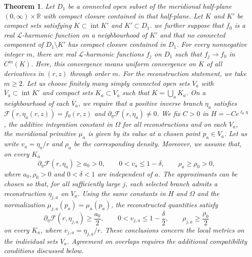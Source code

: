 \documentclass[amsmath,amsfonts,amssymb,aps,pra,superscriptaddress,10pt]{revtex4-2}
\numberwithin{equation}{section}
\theoremstyle{plain}
\newtheorem{theorem}{Theorem}
\theoremstyle{definition}
\theoremstyle{remark}
\theoremstyle{definition}
\newcommand{\ellzero}{\ell_0}
\begin{document}
\begin{theorem}
Let $D_1$ be a connected open subset of the meridional half-plane $(0,\infty)\times\mathbb{R}$ with compact closure contained in that half-plane. Let $K$ and $K'$ be compact sets satisfying $K\subset\operatorname{int}K'$ and $K'\subset D_1$. we further suppose that $f_0$ is a real $\mathcal{L}$-harmonic function on a neighbourhood of $K'$ and that no connected component of $D_1\setminus K'$ has compact closure contained in $D_1$. For every nonnegative integer $m$, there are real $\mathcal{L}$-harmonic functions $f_j$ on $D_1$ such that $f_j\to f_0$ in $C^m(K)$. Here, this convergence means uniform convergence on $K$ of all derivatives in $(r,z)$ through order $m$. For the reconstruction statement, we take $m\geq 2$. Let us choose finitely many simply connected open sets $V_a$ with $\overline{V}_a\subset\operatorname{int}K'$ and compact sets $K_a\subset V_a$ such that $K=\bigcup_a K_a$. On a neighbourhood of each $\overline{V}_a$, we require that a positive inverse branch $\eta_a$ satisfies $\mathcal{F}(r,\eta_a(r,z))=f_0(r,z)$ and $\partial_\eta\mathcal{F}(r,\eta_a)\neq 0$. We fix $C>0$ in $H=-Ce^{\ellzero\eta}$, the additive integration constant in $\Omega$ for all reconstructions and on each $V_a$, the meridional primitive $\mu_a$ is given by its value at a chosen point $p_a\in V_a$. Let us write $v_a=\eta_a/r$ and $\rho_a$ be the corresponding density. Moreover, we assume that, on every $K_a$
\begin{equation}
\partial_\eta\mathcal{F}(r,\eta_a)\geq a_0>0,\qquad
0<v_a\leq 1-\delta,\qquad
\rho_a\geq\rho_0>0,
\end{equation}
where $a_0,\rho_0>0$ and $0<\delta<1$ are independent of $a$. The approximants can be chosen so that, for all sufficiently large $j$, each selected branch admits a reconstruction $\eta_{j,a}$ on $V_a$. Using the same constants in $H$ and $\Omega$ and the normalization $\mu_{j,a}(p_a)=\mu_a(p_a)$, the reconstructed quantities satisfy
\begin{equation}
\partial_\eta\mathcal{F}(r,\eta_{j,a})\geq\frac{a_0}{2},\qquad
0<v_{j,a}\leq 1-\frac{\delta}{2},\qquad
\rho_{j,a}\geq\frac{\rho_0}{2}
\end{equation}
on every $K_a$, where $v_{j,a}=\eta_{j,a}/r$. These conclusions concern the local metrics on the individual sets $V_a$. Agreement on overlaps requires the additional compatibility conditions discussed below.
\end{theorem}
\end{document}
